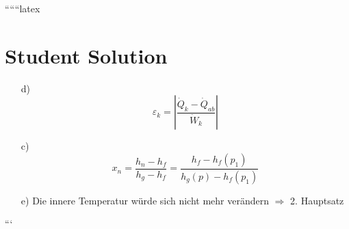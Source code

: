``````latex


\section*{Student Solution}

\begin{itemize}
    \item[d)] \[
    \varepsilon_k = \left| \frac{\dot{Q}_k - \dot{Q}_{ab}}{\dot{W}_k} \right|
    \]

    \item[c)] \[
    x_n = \frac{h_n - h_f}{h_g - h_f} = \frac{h_f - h_f(p_1)}{h_g(p) - h_f(p_1)}
    \]

    \item[e)] Die innere Temperatur würde sich nicht mehr verändern $\Rightarrow$ 2. Hauptsatz
\end{itemize}

```